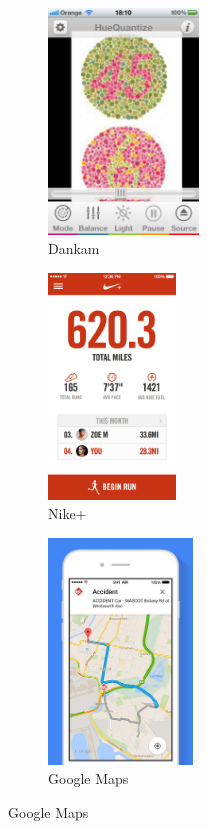 \documentclass[a4paper, 12pt, twoside, openright]{book}
\begin{document}
\begin{figure}[h]
\centering
\begin{subfigure}{.33\textwidth}
  \centering
  \includegraphics[height=6cm]{images/dankam2}
  \caption{\footnotesize{Dankam}}
  \label{fig:dankam}
\end{subfigure}%
\begin{subfigure}{.33\textwidth}
  \centering
  \includegraphics[height=6cm]{images/nikeplus}
  \caption{\footnotesize{Nike+}}
  \label{fig:nike+}
\end{subfigure}
\begin{subfigure}{.33\textwidth}
  \centering
  \includegraphics[height=6cm]{images/googlemaps}
  \caption{\footnotesize{Google Maps}}
  \label{fig:googlemaps}
\end{subfigure}
\end{figure}
\end{document}
